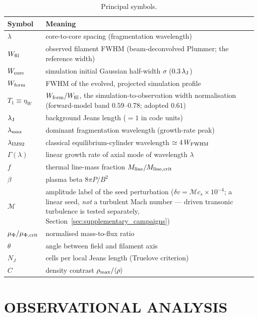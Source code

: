 \documentclass[usenatbib,twoside,twocolumn]{mnras}
\begin{document}
\begin{table}
\caption{Principal symbols.}
\label{tab:symbols}
\footnotesize
\setlength{\tabcolsep}{4pt}
\begin{tabular}{lp{6.1cm}}
\toprule
Symbol & Meaning \\
\midrule
$\lambda$ & core-to-core spacing (fragmentation wavelength) \\
$W_{\rm fil}$ & observed filament FWHM (beam-deconvolved Plummer; the reference width) \\
$W_{\rm core}$ & simulation initial Gaussian half-width $\sigma$ ($0.3\,\lambda_{\rm J}$) \\
$W_{\rm form}$ & FWHM of the evolved, projected simulation profile \\
$T_1\!\equiv\!\eta_W$ & $W_{\rm form}/W_{\rm fil}$, the simulation-to-observation width normalisation (forward-model band $0.59$--$0.78$; adopted $0.61$) \\
$\lambda_{\rm J}$ & background Jeans length ($=1$ in code units) \\
$\lambda_{\rm max}$ & dominant fragmentation wavelength (growth-rate peak) \\
$\lambda_{\rm IM92}$ & classical equilibrium-cylinder wavelength $\simeq4\,W_{\rm FWHM}$ \\
$\Gamma(\lambda)$ & linear growth rate of axial mode of wavelength $\lambda$ \\
$f$ & thermal line-mass fraction $M_{\rm line}/M_{\rm line,crit}$ \\
$\beta$ & plasma beta $8\pi P/B^2$ \\
$\mathcal{M}$ & amplitude label of the seed perturbation ($\delta v=\mathcal{M}c_s\times10^{-4}$; a linear seed, \emph{not} a turbulent Mach number --- driven transonic turbulence is tested separately, Section~\ref{sec:supplementary_campaigns}) \\
$\mu_\Phi/\mu_{\Phi,\rm crit}$ & normalised mass-to-flux ratio \\
$\theta$ & angle between field and filament axis \\
$N_J$ & cells per local Jeans length (Truelove criterion) \\
$C$ & density contrast $\rho_{\rm max}/\langle\rho\rangle$ \\
\bottomrule
\end{tabular}
\end{table}

\section{OBSERVATIONAL ANALYSIS}
\end{document}

